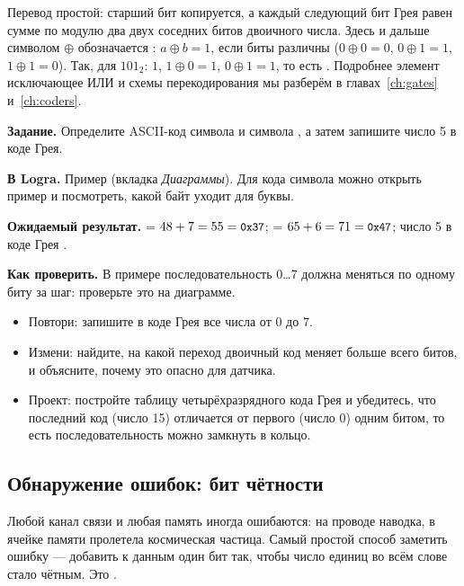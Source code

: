 Перевод простой: старший бит копируется, а каждый следующий бит Грея равен
сумме по модулю два двух соседних битов двоичного числа. Здесь и дальше
символом $\oplus$ обозначается : $a\oplus b=1$, если
биты различны ($0\oplus 0=0$, $0\oplus 1=1$, $1\oplus 1=0$). Так, для
$101_2$: $1$, $1\oplus 0=1$, $0\oplus 1=1$, то есть . Подробнее
элемент исключающее ИЛИ и схемы перекодирования мы разберём в
главах~\ref{ch:gates} и~\ref{ch:coders}. 

\begin{diybox}
\textbf{Задание.} Определите ASCII-код символа  и символа ,
а затем запишите число 5 в коде Грея.\par
\textbf{В Logra.} Пример  (вкладка \emph{Диаграммы}).
Для кода символа можно открыть пример  и посмотреть, какой байт
уходит для буквы.\par
\textbf{Ожидаемый результат.}  = $48+7=55=\texttt{\small 0x37}$;
 = $65+6=71=\texttt{\small 0x47}$; число 5 в коде Грея .\par
\textbf{Как проверить.} В примере  последовательность 0\ldots 7
должна меняться по одному биту за шаг: проверьте это на диаграмме.
\begin{itemize}[leftmargin=3.4em,labelwidth=3em,labelsep=0.4em,align=left]
  \item[\stars{1}] Повтори: запишите в коде Грея все числа от 0 до 7.
  \item[\stars{2}] Измени: найдите, на какой переход двоичный код меняет больше
    всего битов, и объясните, почему это опасно для датчика.
  \item[\stars{3}] Проект: постройте таблицу четырёхразрядного кода Грея и
    убедитесь, что последний код (число 15) отличается от первого (число 0)
    одним битом, то есть последовательность можно замкнуть в кольцо.
\end{itemize}
\end{diybox}

\subsection{Обнаружение ошибок: бит чётности}

Любой канал связи и любая память иногда ошибаются: на проводе наводка, в
ячейке памяти пролетела космическая частица. Самый простой способ заметить
ошибку --- добавить к данным один бит так, чтобы число единиц во всём слове
стало чётным. Это .

